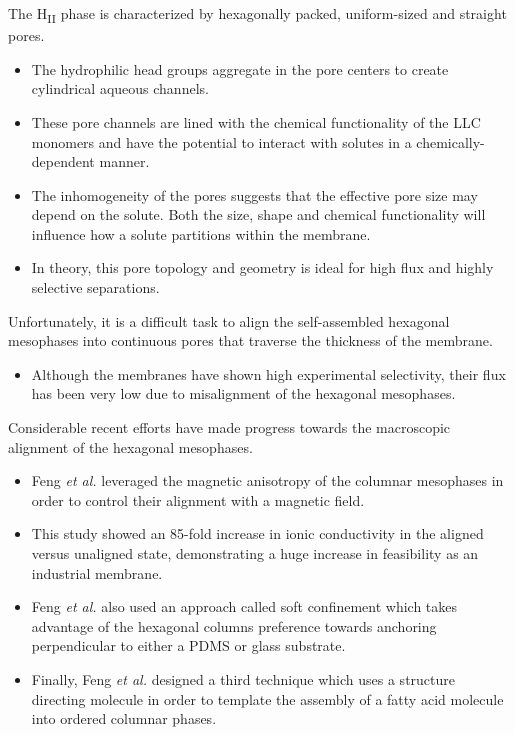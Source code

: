   The H\textsubscript{II} phase is characterized by hexagonally packed, uniform-sized
  and straight pores.~\cite{smith_ordered_1997}
  \begin{itemize}
    \item The hydrophilic head groups aggregate in the pore centers to create
    cylindrical aqueous channels. 
    \item These pore channels are lined with the chemical functionality of the LLC monomers
    and have the potential to interact with solutes in a chemically-dependent manner.
    \item The inhomogeneity of the pores suggests that the effective pore size may depend
    on the solute. Both the size, shape and chemical functionality will influence
    how a solute partitions within the membrane. %
    \item In theory, this pore topology and geometry is ideal for high flux and 
    highly selective separations.
  \end{itemize}
  
  Unfortunately, it is a difficult task to align the self-assembled hexagonal
  mesophases into continuous pores that traverse the thickness of the membrane.
  \begin{itemize}
    \item Although the membranes have shown high experimental selectivity, their 
    flux has been very low due to misalignment of the hexagonal mesophases.~\cite{zhou_supported_2005}
  \end{itemize}
  
  Considerable recent efforts have made progress towards the macroscopic
  alignment of the hexagonal mesophases.
  \begin{itemize}
    \item Feng \textit{et al.} leveraged the magnetic anisotropy of the columnar
    mesophases in order to control their alignment with a magnetic field.~\cite{feng_scalable_2014}
    \item This study showed an 85-fold increase in ionic conductivity in the aligned
    versus unaligned state, demonstrating a huge increase in feasibility as an industrial membrane.
    \item Feng \textit{et al.} also used an approach called soft confinement which
    takes advantage of the hexagonal columns preference towards anchoring
    perpendicular to either a PDMS or glass substrate.~\cite{feng_thin_2016}
    \item Finally, Feng \textit{et al.} designed a third technique which uses a structure
    directing molecule in order to template the assembly of a fatty acid 
    molecule into ordered columnar phases.~\cite{feng_highly_2017}
  \end{itemize}
  
